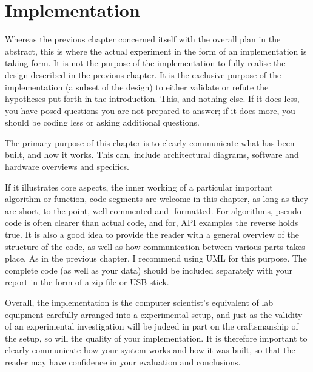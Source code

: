 \chapter{Implementation}
\label{cha:implementation}

Whereas the previous chapter concerned itself with the overall plan in
the abstract, this is where the actual experiment in the form of an
implementation is taking form.  It is not the purpose of the
implementation to fully realise the design described in the previous
chapter. It is the exclusive purpose of the implementation (a subset
of the design) to either validate or refute the hypotheses put forth
in the introduction. This, and nothing else. If it does less, you have
posed questions you are not prepared to answer; if it does more, you
should be coding less or asking additional questions.

The primary purpose of this chapter is to clearly communicate what has
been built, and how it works. This can, \eg include architectural
diagrams, software and hardware overviews and specifics.

If it illustrates core aspects, \eg the inner working of a particular
important algorithm or function, code segments are welcome in this
chapter, as long as they are short, to the point, well-commented and
-formatted.  For algorithms, pseudo code is often clearer than actual
code, and for, \eg \acs{API} examples the reverse holds true.  It is
also a good idea to provide the reader with a general overview of the
structure of the code, as well as how communication between various
parts takes place.  As in the previous chapter, I recommend using
\ac{UML} for this purpose.  The complete code (as well as your data)
should be included separately with your report in the form of a
zip-file or USB-stick.

Overall, the implementation is the computer scientist's equivalent of
lab equipment carefully arranged into a experimental setup, and just
as the validity of an experimental investigation will be judged in
part on the craftsmanship of the setup, so will the quality of your
implementation. It is therefore important to clearly communicate how
your system works and how it was built, so that the reader may have
confidence in your evaluation and conclusions.




